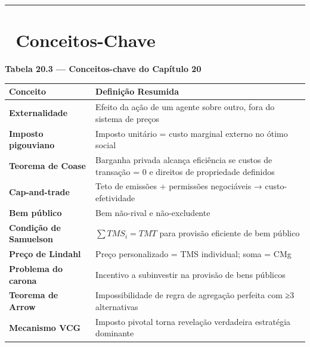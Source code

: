 \documentclass[11pt,twoside,openright]{book}
\begin{document}
\begin{center}\rule{0.5\linewidth}{0.5pt}\end{center}

\section{🔑 Conceitos-Chave}\label{conceitos-chave-2}

\textbf{Tabela 20.3 --- Conceitos-chave do Capítulo 20}

{\def\LTcaptype{none} %
\begin{longtable}[]{@{}
  >{\raggedright\arraybackslash}p{}
  >{\raggedright\arraybackslash}p{}@{}}
\toprule\noalign{}
\begin{minipage}[b]{\linewidth}\raggedright
Conceito
\end{minipage} & \begin{minipage}[b]{\linewidth}\raggedright
Definição Resumida
\end{minipage} \\
\midrule\noalign{}
\endhead
\bottomrule\noalign{}
\endlastfoot
\textbf{Externalidade} & Efeito da ação de um agente sobre outro, fora
do sistema de preços \\
\textbf{Imposto pigouviano} & Imposto unitário = custo marginal externo
no ótimo social \\
\textbf{Teorema de Coase} & Barganha privada alcança eficiência se
custos de transação = 0 e direitos de propriedade definidos \\
\textbf{Cap-and-trade} & Teto de emissões + permissões negociáveis →
custo-efetividade \\
\textbf{Bem público} & Bem não-rival e não-excludente \\
\textbf{Condição de Samuelson} & \(\sum TMS_i = TMT\) para provisão
eficiente de bem público \\
\textbf{Preço de Lindahl} & Preço personalizado = TMS individual; soma =
CMg \\
\textbf{Problema do carona} & Incentivo a subinvestir na provisão de
bens públicos \\
\textbf{Teorema de Arrow} & Impossibilidade de regra de agregação
perfeita com ≥3 alternativas \\
\textbf{Mecanismo VCG} & Imposto pivotal torna revelação verdadeira
estratégia dominante \\
\end{longtable}
}
\end{document}

